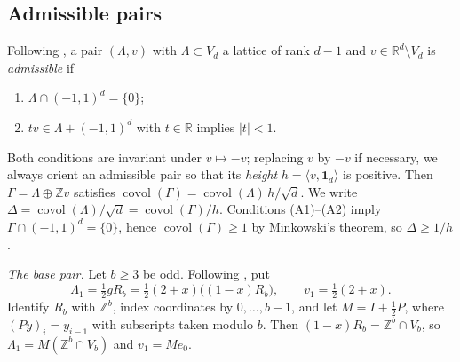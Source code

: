 \documentclass[12pt]{article}
\newcommand{\Z}{\mathbb{Z}}
\newcommand{\R}{\mathbb{R}}
\newcommand{\covol}{\operatorname{covol}}
\newcommand{\one}{\mathbf{1}}
\newcommand{\dcube}[1]{(-#1,#1)}
\newcommand{\Lat}{\Lambda}
\newcommand{\gpoly}{g}
\begin{document}
\subsection{Admissible pairs}
Following \cite{EP1}, a pair $(\Lat,v)$ with $\Lat\subset V_d$ a lattice of rank $d-1$ and $v\in\R^d\setminus V_d$ is
\emph{admissible} if
\begin{enumerate}[label=(A\arabic*)]
\item $\Lat\cap\dcube1^d=\{0\}$;
\item $tv\in\Lat+\dcube1^d$ with $t\in\R$ implies $|t|<1$.
\end{enumerate}
Both conditions are invariant under $v\mapsto-v$; replacing $v$ by $-v$ if necessary, we always orient an admissible pair so
that its \emph{height} $h=\langle v,\one_d\rangle$ is positive. Then $\Gamma=\Lat\oplus\Z v$ satisfies
$\covol(\Gamma)=\covol(\Lat)\,h/\sqrt d$. We write $\Delta=\covol(\Lat)/\sqrt d=\covol(\Gamma)/h$.
Conditions (A1)--(A2) imply $\Gamma\cap\dcube1^d=\{0\}$, hence $\covol(\Gamma)\ge1$ by Minkowski's theorem, so
$\Delta\ge1/h$.

\medskip\noindent\emph{The base pair.} Let $b\ge3$ be odd. Following \cite{EP1}, put
\[
 \Lat_1=\tfrac12\gpoly R_b
       =\tfrac12(2+x)\bigl((1-x)R_b\bigr),
 \qquad v_1=\tfrac12(2+x).
\]
Identify $R_b$ with $\Z^b$, index coordinates by $0,\dots,b-1$, and let
$M=I+\frac12P$, where $(Py)_i=y_{i-1}$ with subscripts taken modulo $b$.
Then $(1-x)R_b=\Z^b\cap V_b$, so
$\Lat_1=M(\Z^b\cap V_b)$ and $v_1=Me_0$.
\end{document}
